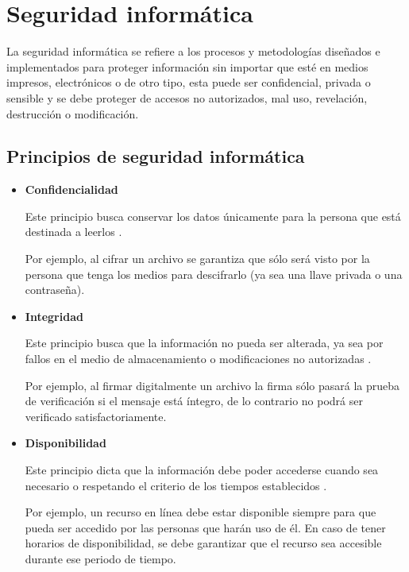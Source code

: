 \section {Seguridad inform\'{a}tica}

La seguridad inform\'{a}tica se refiere a los procesos y metodolog\'{i}as dise\~{n}ados e implementados para proteger informaci\'{o}n sin importar que est\'{e} en medios impresos, electr\'{o}nicos o de otro tipo, esta puede ser confidencial, privada o sensible y se debe proteger de accesos no autorizados, mal uso, revelaci\'{o}n, destrucci\'{o}n o modificaci\'{o}n. \cite{_sans:_????}

  \subsection {Principios de seguridad inform\'{a}tica}

\begin{itemize}

  \item \textbf{Confidencialidad}

Este principio busca conservar los datos \'{u}nicamente para la persona que est\'{a} destinada a leerlos \cite{_nist_????}\cite{_information_????}.

Por ejemplo, al cifrar un archivo se garantiza que s\'{o}lo ser\'{a} visto por la persona que tenga los medios para descifrarlo (ya sea una llave privada o una contrase\~{n}a).

  \item \textbf{Integridad}

Este principio busca que la informaci\'{o}n no pueda ser alterada, ya sea por fallos en el medio de almacenamiento o modificaciones no autorizadas \cite{_nist_????}\cite{_information_????}.

Por ejemplo, al firmar digitalmente un archivo la firma s\'{o}lo pasar\'{a} la prueba de verificaci\'{o}n si el mensaje est\'{a} \'{i}ntegro, de lo contrario no podr\'{a} ser verificado satisfactoriamente.

\newpage
  \item \textbf{Disponibilidad}

Este principio dicta que la informaci\'{o}n debe poder accederse cuando sea necesario o respetando el criterio de los tiempos establecidos \cite{_nist_????}\cite{_information_????}.

Por ejemplo, un recurso en l\'{i}nea debe estar disponible siempre para que pueda ser accedido por las personas que har\'{a}n uso de \'{e}l. En caso de tener horarios de disponibilidad, se debe garantizar que el recurso sea accesible durante ese periodo de tiempo.

\end{itemize}


